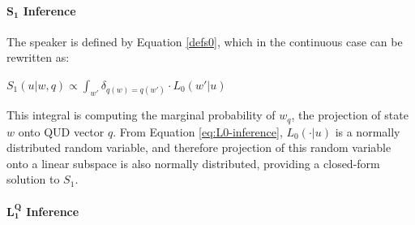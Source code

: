\documentclass[9pt,twocolumn,twoside,lineno]{pnas-new}
\newcommand{\Listener}{L}
\newcommand{\QLONE}{\Listener_{{1}}^{{Q}}}
\begin{document}
{\paragraph{$\mathbf{S_1}$ Inference}
		The speaker is defined by Equation \ref{defs0}, which in the continuous case can be rewritten as:
		\begin{examples}
		\item $S_1(u\vert w,q) \propto \int_{w'} \delta_{q(w)=q(w')} \cdot L_0(w'\vert u)$
		\end{examples}
		This integral is computing the marginal probability of $w_q$, the projection of state $w$ onto QUD vector $q$. From Equation \ref{eq:L0-inference}, $L_0(\cdot \vert u)$ is a normally distributed random variable, and therefore projection of this random variable onto a linear subspace is also normally distributed, providing a closed-form solution to $S_1$.







\paragraph{$\mathbf{\QLONE}$ Inference}





	




}
\end{document}
